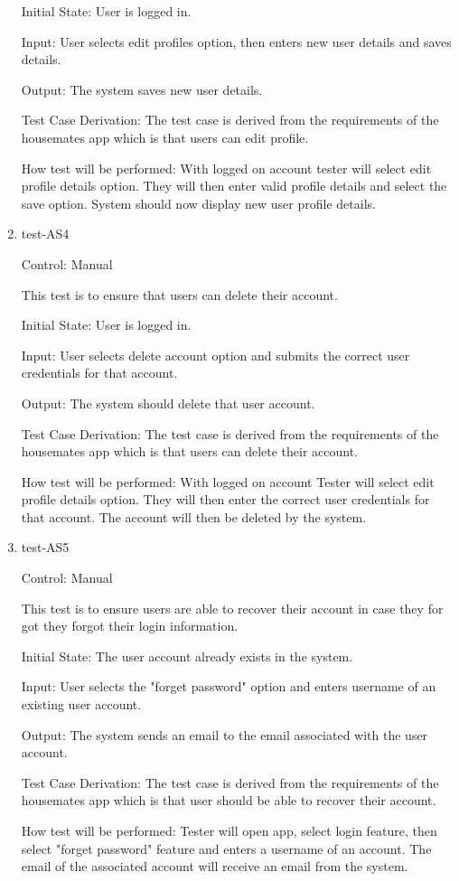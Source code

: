 \documentclass[12pt, titlepage]{article}
\begin{document}
\begin{enumerate}
Initial State: User is logged in.
					
Input: User selects edit profiles option, then enters new user details and saves details.
					
Output: The system saves new user details.

Test Case Derivation: The test case is derived from the requirements of the housemates app which is that users can edit profile.

How test will be performed: With logged on account tester will select edit profile details option. They will then enter valid profile details and select the save option. System should now display new user profile details.

\item{test-AS4\\}

Control: Manual

This test is to ensure that users can delete their account.

Initial State: User is logged in.
					
Input: User selects delete account option and submits the correct user credentials for that account.
					
Output: The system should delete that user account.

Test Case Derivation: The test case is derived from the requirements of the housemates app which is that users can delete their account.

How test will be performed: With logged on account Tester will select edit profile details option. They will then enter the correct user credentials for that account. The account will then be deleted by the system.



\item{test-AS5\\}

Control: Manual


This test is to ensure users are able to recover their account in case they for got they forgot their login information.

Initial State: The user account already exists in the system.
					
Input: User selects the "forget password" option and enters username of an existing user account.
					
Output: The system sends an email to the email associated with the user account.

Test Case Derivation: The test case is derived from the requirements of the housemates app which is that user should be able to recover their account.

How test will be performed: Tester will open app, select login feature, then select "forget password" feature and enters a username of an account. The email of the associated account will receive an email from the system.

\end{enumerate}
\end{document}

